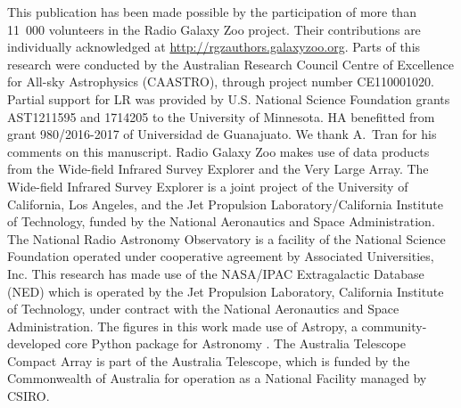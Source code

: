 \documentclass[fleqn,usenatbib,usedcolumn]{mnras}
\begin{document}
  This publication has been made possible by the participation of more than 11~000 volunteers in the Radio Galaxy Zoo project. Their contributions are individually acknowledged at \url{http://rgzauthors.galaxyzoo.org}. Parts of this research were conducted by the Australian Research Council Centre of Excellence for All-sky Astrophysics (CAASTRO), through project number CE110001020. Partial support for LR was provided by U.S. National Science Foundation grants AST1211595 and 1714205 to the University of Minnesota. HA benefitted from grant 980/2016-2017 of Universidad de Guanajuato. We thank A.~Tran for his comments on this manuscript. Radio Galaxy Zoo makes use of data products from the Wide-field Infrared Survey Explorer and the Very Large Array. The Wide-field Infrared Survey Explorer is a joint project of the University of California, Los Angeles, and the Jet Propulsion Laboratory/California Institute of Technology, funded by the National Aeronautics and Space Administration. The National Radio Astronomy Observatory is a facility of the National Science Foundation operated under cooperative agreement by Associated Universities, Inc. This research has made use of the NASA/IPAC Extragalactic Database (NED) which is operated by the Jet Propulsion Laboratory, California Institute of Technology, under contract with the National Aeronautics and Space Administration. The figures in this work made use of Astropy, a community-developed core Python package for Astronomy \citep{astropy}. The Australia Telescope Compact Array is part of the Australia Telescope, which is funded by the Commonwealth of Australia for operation as a National Facility managed by CSIRO.

%




\bsp	%
\label{lastpage}
\end{document}
